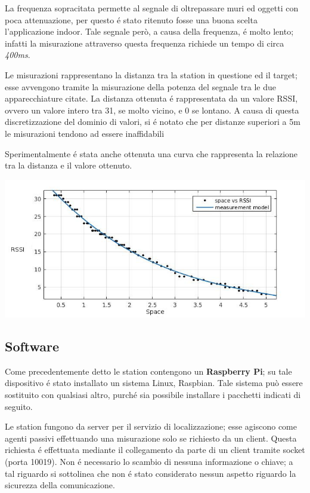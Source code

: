 \documentclass{article}
\begin{document}
La frequenza sopracitata permette al segnale di oltrepassare muri ed oggetti con poca attenuazione, per questo \'e stato ritenuto fosse una buona scelta l'applicazione indoor.
Tale segnale per\`o, a causa della frequenza, \'e molto lento; infatti la misurazione attraverso questa frequenza richiede un tempo di circa \textit{400ms}.

Le misurazioni rappresentano la distanza tra la station in questione ed il target; esse avvengono tramite la misurazione della potenza del segnale tra le due apparecchiature citate.
La distanza ottenuta \'e rappresentata da un valore RSSI, ovvero un valore intero tra 31, se molto vicino, e 0 se lontano.
A causa di questa discretizzazione del dominio di valori, si \'e notato che per distanze superiori a 5m le misurazioni tendono ad essere inaffidabili

Sperimentalmente \'e stata anche ottenuta una curva che rappresenta la relazione tra la distanza e il valore ottenuto.

\begin{center}
	\includegraphics[scale=0.5]{manual_imgs/space_to_rssi}
\end{center}

\subsection{Software}
Come precedentemente detto le station contengono un \textbf{Raspberry Pi}; su tale dispositivo \'e stato installato un sistema Linux, Raspbian. Tale sistema pu\`o essere sostituito con qualsiasi altro, purch\'e sia possibile installare i pacchetti indicati di seguito.

Le station fungono da server per il servizio di localizzazione; esse agiscono come agenti passivi effettuando una misurazione solo se richiesto da un client.
Questa richiesta \'e effettuata mediante il collegamento da parte di un client tramite socket (porta 10019). Non \'e necessario lo scambio di nessuna informazione o chiave; a tal riguardo si sottolinea che non \'e stato considerato nessun aspetto riguardo la sicurezza della comunicazione.
\end{document}
